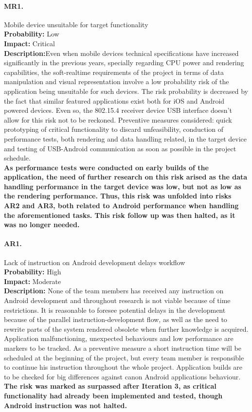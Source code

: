 		\paragraph{MR1.}Mobile device unsuitable for target functionality\\
		\textbf{Probability:} Low\\
		\textbf{Impact:} Critical\\
		\textbf{Description:}Even when mobile devices technical specifications have increased significantly in the previous years, specially regarding CPU power and rendering capabilities, the soft-realtime requirements of the project in terms of data manipulation and visual representation involve a low probability risk of the application being unsuitable for such devices. The risk probability is decreased by the fact that similar featured applications exist both for iOS and Android powered devices. Even so, the 802.15.4 receiver device USB interface doesn't allow for this risk not to be reckoned.
		Preventive measures considered: quick prototyping of critical functionality to discard  unfeasibility, conduction of performance tests, both rendering and data handling related, in the target device and testing of USB-Android communication as soon as possible in the project schedule.\\
		\textbf{As performance tests were conducted on early builds of the application, the need of further research on this risk arised as the data handling performance in the target device was low, but not as low as the rendering performance. Thus, this risk was unfolded into risks AR2 and AR3, both related to Android performance when handling the aforementioned tasks. This risk follow up was then halted, as it was no longer needed.}

		\paragraph{AR1.}Lack of instruction on Android development delays workflow\\
		\textbf{Probability:} High\\
		\textbf{Impact:} Moderate\\
		\textbf{Description:} None of the team members has received any instruction on Android development and throughout research is not viable because of time restrictions. It is reasonable to foresee potential delays in the development because of the parallel instruction-development flow, as well as the need to rewrite parts of the system rendered obsolete when further knowledge is acquired.
		Application malfunctioning, unexpected behaviours and low performance are markers to be tracked.
		As a preventive measure a short instruction time will be scheduled at the beginning of the project, but every team member is responsible to continue his instruction throughout the whole project. Application builds are to be checked for big differences against canon Android applications behaviour.\\
		\textbf{The risk was marked as surpassed after Iteration 3, as critical functionality had already been implemented and tested, though Android instruction was not halted.}


